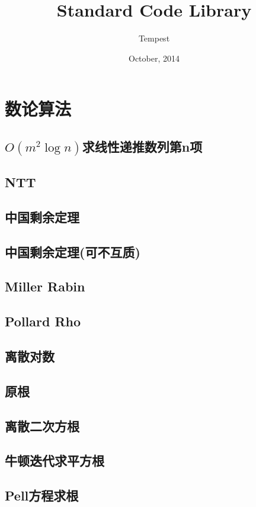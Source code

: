 \documentclass[a4paper,10pt]{book}
\title{\LARGE{Standard Code Library}}
\author{Tempest}
\date{October, 2014}
\begin{document}
\maketitle
\tableofcontents
\newpage
\chapter{数论算法}
	\section{$O(m^2\log n)$求线性递推数列第n项}
		
	\section{NTT}
		
	\section{中国剩余定理}
		
	\section{中国剩余定理(可不互质)}
		
	\section{Miller Rabin}	
		
	\section{Pollard Rho}
		
	\section{离散对数}
		
	\section{原根}
		
	\section{离散二次方根}
		
	\section{牛顿迭代求平方根}
		
	\section{Pell方程求根}
		
\end{document}
